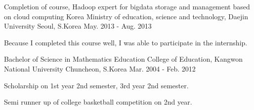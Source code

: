 

\begin{cventries}

  \cventry
    {Completion of course, Hadoop expert for bigdata storage and management based on cloud computing} %
    {Korea Ministry of education, science and technology, Daejin University} %
    {Seoul, S.Korea} %
    {May. 2013 - Aug. 2013} %
    {
      \begin{cvitems} %
        \item {Because I completed this course well, I was able to participate in the internship.}
      \end{cvitems}
    }

  \cventry
    {Bachelor of Science in Mathematics Education} %
    {College of Education, Kangwon National University} %
    {Chuncheon, S.Korea} %
    {Mar. 2004 - Feb. 2012} %
    {
      \begin{cvitems} %
        \item {Scholarship on 1st year 2nd semester, 3rd year 2nd semester.}
        \item {Semi runner up of college basketball competition on 2nd year.}
      \end{cvitems}
    }

\end{cventries}
